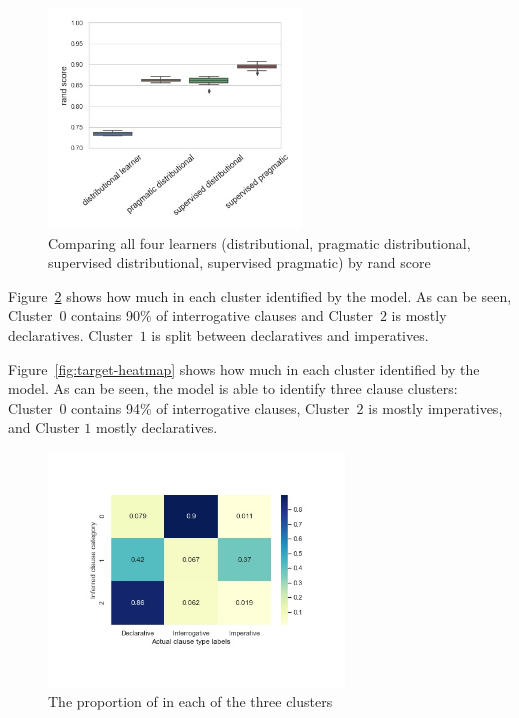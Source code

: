 \begin{figure}[H]
    \centering
    \includegraphics[width=0.6\textwidth]{figures/compare-rand.jpg}
    \caption{Comparing all four learners (distributional, pragmatic distributional, supervised distributional, supervised pragmatic) by rand score }
    \label{fig:compare-rand}
\end{figure}


Figure~\ref{fig:baseline-heatmap} shows how much \diis{} in each cluster identified by the model. As can be seen, Cluster~$0$ contains 90\% of interrogative clauses and Cluster~$2$ is mostly declaratives. Cluster~$1$ is split between declaratives and imperatives.

Figure~\ref{fig:target-heatmap} shows how much \diis{} in each cluster identified by the \plearnerabbr{} model. As can be seen, the model is able to identify three clause clusters: Cluster~$0$ contains 94\% of interrogative clauses, Cluster~$2$ is mostly imperatives, and Cluster $1$ mostly declaratives. 

\begin{figure}[H]
    \centering
    \includegraphics[width=0.7\textwidth]{figures/baseline-heatmap.jpg}
    \caption{The proportion of \diis{} in each of the three clusters}
    \label{fig:baseline-heatmap}
\end{figure}

